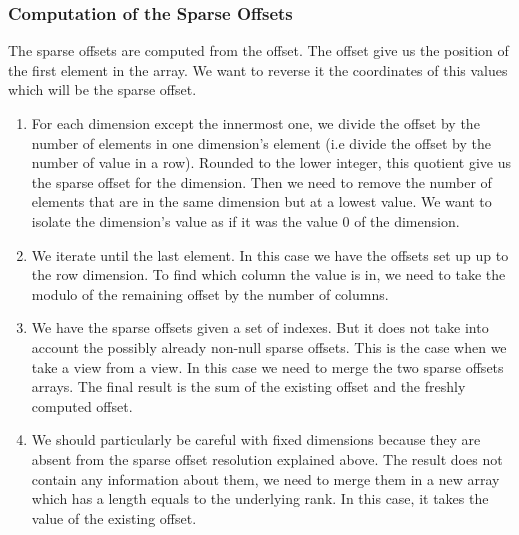 \subsubsection{Computation of the Sparse Offsets}

The sparse offsets are computed from the offset. The offset give us the position of the first element in the array. We want to reverse it the coordinates of this values which will be the sparse offset. 


\begin{enumerate}
	\item For each dimension except the innermost one, we divide the offset by the number of elements in one dimension's element (i.e divide the offset by the number of value in a row). Rounded to the lower integer, this quotient give us the sparse offset for the dimension. Then we need to remove the number of elements that are in the same dimension but at a lowest value. We want to isolate the dimension's value as if it was the value 0 of the dimension.
	\item We iterate until the last element. In this case we have the offsets set up up to the row dimension. To find which column the value is in, we need to take the modulo of the remaining offset by the number of columns.
	\item We have the sparse offsets given a set of indexes. But it does not take into account the possibly already non-null sparse offsets. This is the case when we take a view from a view. In this case we need to merge the two sparse offsets arrays. The final result is the sum of the existing offset and the freshly computed offset.
	\item We should particularly be careful with fixed dimensions because they are absent from the sparse offset resolution explained above. The result does not contain any information about them, we need to merge them in a new array which has a length equals to the underlying rank. In this case, it takes the value of the existing offset.

\end{enumerate}

